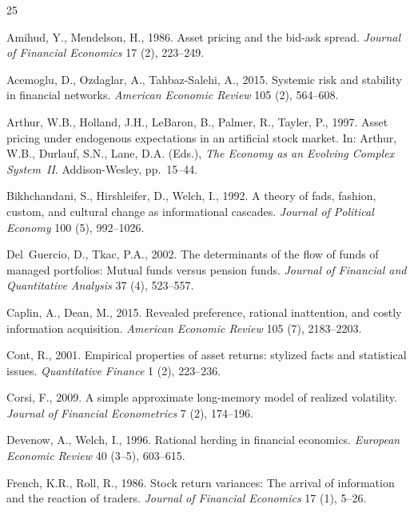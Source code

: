 \renewcommand{\refname}{References}\begin{thebibliography}{25}

Amihud, Y., Mendelson, H., 1986.
Asset pricing and the bid-ask spread.
\textit{Journal of Financial Economics} 17 (2), 223--249.

Acemoglu, D., Ozdaglar, A., Tahbaz-Salehi, A., 2015.
Systemic risk and stability in financial networks.
\textit{American Economic Review} 105 (2), 564--608.

Arthur, W.B., Holland, J.H., LeBaron, B., Palmer, R., Tayler, P., 1997.
Asset pricing under endogenous expectations in an artificial stock market.
In: Arthur, W.B., Durlauf, S.N., Lane, D.A. (Eds.),
\textit{The Economy as an Evolving Complex System~II}.
Addison-Wesley, pp.\ 15--44.

Bikhchandani, S., Hirshleifer, D., Welch, I., 1992.
A theory of fads, fashion, custom, and cultural change as informational
cascades.
\textit{Journal of Political Economy} 100 (5), 992--1026.

Del~Guercio, D., Tkac, P.A., 2002.
The determinants of the flow of funds of managed portfolios:
Mutual funds versus pension funds.
\textit{Journal of Financial and Quantitative Analysis} 37 (4), 523--557.

Caplin, A., Dean, M., 2015.
Revealed preference, rational inattention, and costly information acquisition.
\textit{American Economic Review} 105 (7), 2183--2203.

Cont, R., 2001.
Empirical properties of asset returns: stylized facts and statistical issues.
\textit{Quantitative Finance} 1 (2), 223--236.

Corsi, F., 2009.
A simple approximate long-memory model of realized volatility.
\textit{Journal of Financial Econometrics} 7 (2), 174--196.

Devenow, A., Welch, I., 1996.
Rational herding in financial economics.
\textit{European Economic Review} 40 (3--5), 603--615.

French, K.R., Roll, R., 1986.
Stock return variances: The arrival of information and the reaction
of traders.
\textit{Journal of Financial Economics} 17 (1), 5--26.


\end{thebibliography}
